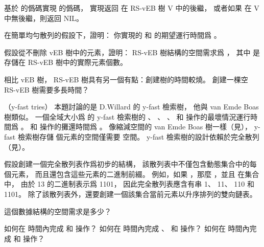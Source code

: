 \startANSWER
{}
\stopANSWER

\startigBase[continue]\startitem
基於  的僞碼實現  的僞碼，
實現返回  在 RS-vEB 樹 V 中的後繼，
或者如果  在 V 中無後繼，則返回 NIL。
\stopitem\stopigBase

\startANSWER
{}
\stopANSWER

\startigBase[continue]\startitem
在簡單均勻散列的假設下，證明：
你實現的  和  的期望運行時間爲 。
\stopitem\stopigBase

\startANSWER
{}
\stopANSWER

\startigBase[continue]\startitem
假設從不刪除 vEB 樹中的元素，證明： RS-vEB 樹結構的空間需求爲 ，
其中  是存儲在 RS-vEB 樹中的實際元素個數。
\stopitem\stopigBase

\startANSWER
{}
\stopANSWER

\startigBase[continue]\startitem
相比 vEB 樹， RS-vEB 樹具有另一個有點：創建樹的時間較燒。
創建一棵空 RS-vEB 樹需要多長時間？
\stopitem\stopigBase

\startANSWER
{}
\stopANSWER

\stopPROBLEM

\startPROBLEM
（y-fast tries）
本題討論的是 D.Willard 的 y-fast 檢索樹，
他與 van Emde Boas 樹類似。
一個全域大小爲  的 y-fast 檢索樹的 、 、 、
  和  操作的最壞情況運行時間爲 。
  和  操作的攤還時間爲 。
像縮減空間的 van Emde Boas 樹一樣（見），
 y-fast 檢索樹存儲  個元素的空間僅需要  空間。
 y-fast 檢索樹的設計依賴於完全散列（見）。

 假設創建一個完全散列表作爲初步的結構，
 該散列表中不僅包含動態集合中的每個元素，
 而且還包含這些元素的二進制前綴。
 例如，如果 ，那麼 ，並且  在集合中，
 由於 13 的二進制表示爲 1101，
 因此完全散列表應含有串 1、 11、 110 和 1101。
 除了該散列表外，還要創建一個該集合當前元素以升序排列的雙向鏈表。

\startigBase[a]\startitem
這個數據結構的空間需求是多少？
\stopitem\stopigBase

\startANSWER
{}
\stopANSWER

\startigBase[continue]\startitem
如何在  時間內完成  和  操作？
如何在  時間內完成 、  和  操作？
如何在  時間內完成  和  操作？
\stopitem\stopigBase

